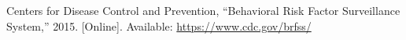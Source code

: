 \documentclass[10pt,conference,compsocconf]{IEEEtran}
\begin{document}
\vspace{0.3cm}


\begin{thebibliography}{1}
Centers for Disease Control and Prevention, ``Behavioral Risk Factor Surveillance System,'' 2015. [Online]. Available: \url{https://www.cdc.gov/brfss/}
\end{thebibliography}
\end{document}
